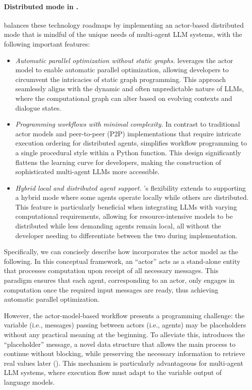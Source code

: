 \paragraph{Distributed mode in \ours.}
\ours balances these technology roadmaps by implementing an actor-based distributed mode that is mindful of the unique needs of multi-agent LLM systems, with the following important features:

\begin{itemize}
    \item \textit{Automatic parallel optimization without static graphs.}
\ours leverages the actor model to enable automatic parallel optimization, allowing developers to circumvent the intricacies of static graph programming. This approach seamlessly aligns with the dynamic and often unpredictable nature of LLMs, where the computational graph can alter based on evolving contexts and dialogue states.
    \item \textit{Programming workflows with minimal complexity.}
In contrast to traditional actor models and peer-to-peer (P2P) implementations that require intricate execution ordering for distributed agents, \ours simplifies workflow programming to a single procedural style within a Python function. This design significantly flattens the learning curve for developers, making the construction of sophisticated multi-agent LLMs more accessible.
    \item \textit{Hybrid local and distributed agent support.}
\ours's flexibility extends to supporting a hybrid mode where some agents operate locally while others are distributed. This feature is particularly beneficial when integrating LLMs with varying computational requirements, allowing for resource-intensive models to be distributed while less demanding agents remain local, all without the developer needing to differentiate between the two during implementation.
\end{itemize}

Specifically, we can concisely describe how \ours incorporates the actor model as the following. 
In this conceptual framework, an ``actor'' acts as a stand-alone entity that processes computation upon receipt of all necessary messages. This paradigm ensures that each agent, corresponding to an actor, only engages in computation once the required input messages are ready, thus achieving automatic parallel optimization.

However, the actor-model-based workflow presents a programming challenge: the variable (i.e., messages) passing between actors (i.e., agents) may be placeholders without any practical meaning at the beginning. 
To alleviate this, \ours introduces the ``placeholder'' message, a novel data structure that allows the main process to continue without blocking, while preserving the necessary information to retrieve real values later (). This mechanism is particularly advantageous for multi-agent LLM systems, where execution flow must adapt to the variable output of language models.


